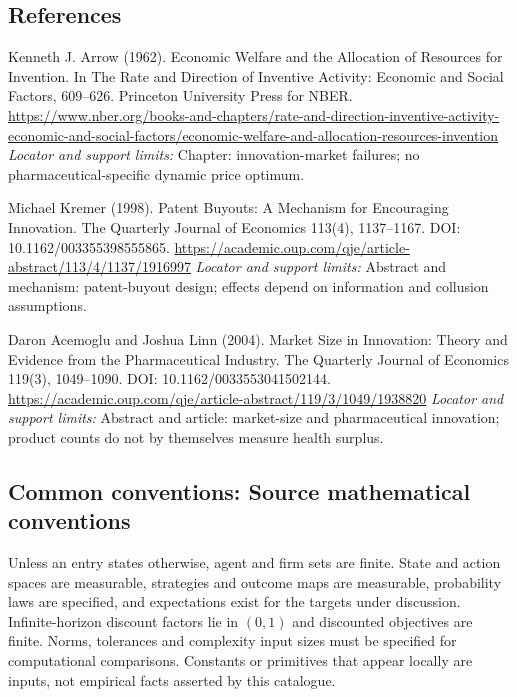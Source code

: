 \documentclass[11pt,a4paper]{article}
\begin{document}
\subsection*{References}
\begin{enumerate}[label={[S\arabic*]},leftmargin=*,itemsep=0.6em]
\item Kenneth J. Arrow (1962). Economic Welfare and the Allocation of Resources for Invention. In The Rate and Direction of Inventive Activity: Economic and Social Factors, 609--626. Princeton University Press for NBER.
\url{https://www.nber.org/books-and-chapters/rate-and-direction-inventive-activity-economic-and-social-factors/economic-welfare-and-allocation-resources-invention}
\newline\emph{Locator and support limits:} Chapter: innovation-market failures; no pharmaceutical-specific dynamic price optimum.
\item Michael Kremer (1998). Patent Buyouts: A Mechanism for Encouraging Innovation. The Quarterly Journal of Economics 113(4), 1137--1167. DOI: 10.1162/003355398555865.
\url{https://academic.oup.com/qje/article-abstract/113/4/1137/1916997}
\newline\emph{Locator and support limits:} Abstract and mechanism: patent-buyout design; effects depend on information and collusion assumptions.
\item Daron Acemoglu and Joshua Linn (2004). Market Size in Innovation: Theory and Evidence from the Pharmaceutical Industry. The Quarterly Journal of Economics 119(3), 1049--1090. DOI: 10.1162/0033553041502144.
\url{https://academic.oup.com/qje/article-abstract/119/3/1049/1938820}
\newline\emph{Locator and support limits:} Abstract and article: market-size and pharmaceutical innovation; product counts do not by themselves measure health surplus.
\end{enumerate}

\subsection*{Common conventions: Source mathematical conventions}

Unless an entry states otherwise, agent and firm sets are finite. State and action spaces are measurable, strategies and outcome maps are measurable, probability laws are specified, and expectations exist for the targets under discussion. Infinite-horizon discount factors lie in $(0,1)$ and discounted objectives are finite. Norms, tolerances and complexity input sizes must be specified for computational comparisons. Constants or primitives that appear locally are inputs, not empirical facts asserted by this catalogue.
\end{document}
